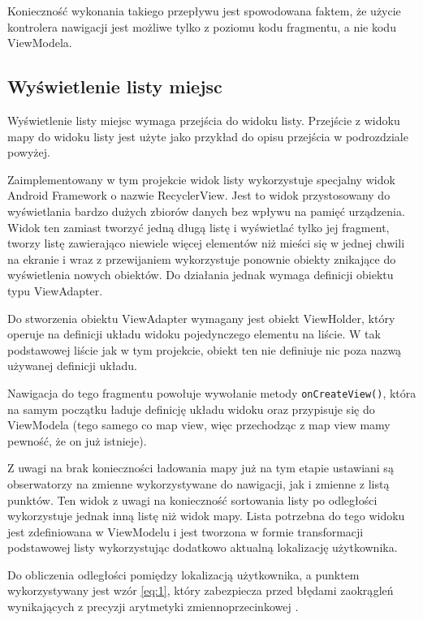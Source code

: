 \documentclass[polish,polish,a4paper,12pt]{article}
\begin{document}
	Konieczność wykonania takiego przepływu jest spowodowana faktem, że użycie kontrolera nawigacji jest możliwe tylko z poziomu kodu fragmentu, a nie kodu ViewModela.

	\subsection{Wyświetlenie listy miejsc}

	Wyświetlenie listy miejsc wymaga przejścia do widoku listy. Przejście z widoku mapy do widoku listy jest użyte jako przykład do opisu przejścia w podrozdziale powyżej.

	Zaimplementowany w tym projekcie widok listy wykorzystuje specjalny widok Android Framework o nazwie RecyclerView. Jest to widok przystosowany do wyświetlania bardzo dużych zbiorów danych bez wpływu na pamięć urządzenia. Widok ten zamiast tworzyć jedną długą listę i wyświetlać tylko jej fragment, tworzy listę zawierająco niewiele więcej elementów niż mieści się w jednej chwili na ekranie i wraz z przewijaniem wykorzystuje ponownie obiekty znikające do wyświetlenia nowych obiektów. Do działania jednak wymaga definicji obiektu typu ViewAdapter.

	Do stworzenia obiektu ViewAdapter wymagany jest obiekt ViewHolder, który operuje na definicji układu widoku pojedynczego elementu na liście. W tak podstawowej liście jak w tym projekcie, obiekt ten nie definiuje nic poza nazwą używanej definicji układu.

	Nawigacja do tego fragmentu powołuje wywołanie metody \texttt{onCreateView()}, która na samym początku ładuje definicję układu widoku oraz przypisuje się do ViewModela (tego samego co map view, więc przechodząc z map view mamy pewność, że on już istnieje).

	Z uwagi na brak konieczności ładowania mapy już na tym etapie ustawiani są obserwatorzy na zmienne wykorzystywane do nawigacji, jak i zmienne z listą punktów. Ten widok z uwagi na konieczność sortowania listy po odległości wykorzystuje jednak inną listę niż widok mapy. Lista potrzebna do tego widoku jest zdefiniowana w ViewModelu i jest tworzona w formie transformacji podstawowej listy wykorzystując dodatkowo aktualną lokalizację użytkownika.

	Do obliczenia odległości pomiędzy lokalizacją użytkownika, a punktem wykorzystywany jest wzór \ref{eq:1}, który zabezpiecza przed błędami zaokrągleń wynikających z precyzji arytmetyki zmiennoprzecinkowej \cite{haversineformulawiki}.
\end{document}
